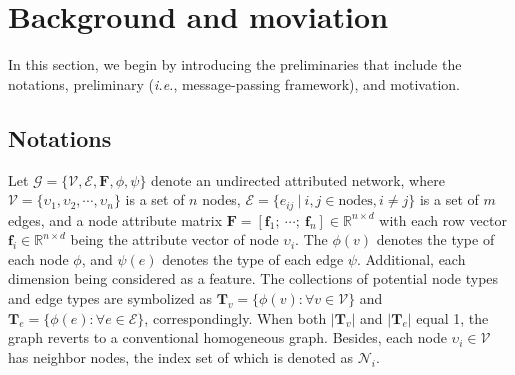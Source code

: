 \section{Background and moviation}
\label{sec:preliminary}

In this section, we begin by introducing the preliminaries that include the notations, preliminary (\emph{i.e.}, message-passing framework), and motivation. %

\subsection{Notations} \label{sec:notation}
Let $\mathcal{G} =\{\mathcal{V}, \mathcal{E}, \mathbf{F}, \phi, \psi \}$ denote an undirected attributed network, where $\mathcal{V} = \{ \upsilon_1, \upsilon_2, \cdots, \upsilon_{n} \}$ is a set of $n$ nodes, $\mathcal{E} = \{e_{ij}\ |\ i, j \in \text{nodes}, i \neq j\}$ is a set of $m$ edges, and a node attribute matrix $\mathbf{F} = [\mathbf{f}_{1};\ \cdots;\ \mathbf{f}_{n}] \in \mathbb{R}^{n \times d} $ with each row vector $\mathbf{f}_{i} \in \mathbb{R}^{n \times d} $ being the attribute vector of node $\upsilon_i$.
The $\phi(v)$ denotes the type of each node $\phi$, and $\psi(e)$ denotes the type of each edge $\psi$. 
Additional, each dimension being considered as a feature.
%
The collections of potential node types and edge types are symbolized as $\mathbf{T}_v=\{\phi(v): \forall v \in \mathcal{V}\}$ and $\mathbf{T}_e=\{\phi(e): \forall e \in \mathcal{E}\}$, correspondingly. 
When both $|\mathbf{T}_v|$ and $|\mathbf{T}_e|$ equal 1, the graph reverts to a conventional homogeneous graph.
%
Besides, each node $\upsilon_i \in \mathcal{V}$ has neighbor nodes, the index set of which is denoted as $\mathcal{N}_{i}$. 

